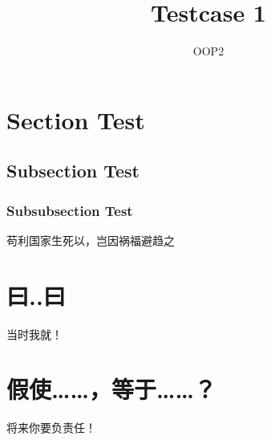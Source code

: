 \documentclass[12pt, a4paper]{article}
\title{Testcase 1}
\author{OOP2}
\begin{document}
\maketitle

\tableofcontents

\newpage

\section{Section Test}

\subsection{Subsection Test}

\subsubsection{Subsubsection Test}

苟利国家生死以，岂因祸福避趋之
\section{曰..曰}

当时我就！
\section{假使……，等于……？}

将来你要负责任！
\par
\end{document}

